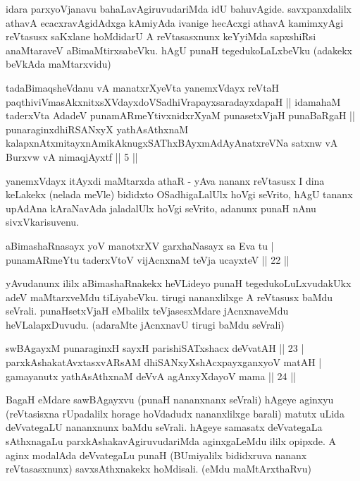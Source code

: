 \begin{artha}
idara parxyoVjanavu bahaLavAgiruvudariMda idU bahuvAgide. 
savxpanxdalilx athavA ecacxravAgidAdxga kAmiyAda ivanige hecAcxgi 
athavA kamimxyAgi reVtasusx saKxlane hoMdidarU A reVtasasxnunx 
keYyiMda sapxshiRsi anaMtaraveV aBimaMtirxsabeVku. hAgU punaH 
tegedukoLaLxbeVku (adakekx beVkAda maMtarxvidu)
\end{artha}


\begin{shl}
tadaBimaqsheVdanu vA manatxrXyeVta yanemxV\s dayx reVtaH paqthiviVmasAkxnitxsXVdayxdoVSadhiVrapayxsaradayxdapaH || idamahaM taderxVta AdadeV punamARmeYtivxnidxrXyaM punasetxVjaH punaBaRgaH || punaraginxdhiRSANxyX yathAsAthxnaM kalapxnAtxmitayxnAmikAknugxSAThxBAyxmAdAyAnatxreVNa satxnw vA Burxvw vA nimaqjAyxtf || 5 ||
\end{shl}

\begin{artha}
yanemxVdayx itAyxdi maMtarxda athaR - yAva nananx reVtasusx I dina 
keLakekx (nelada meVle) bididxto OSadhigaLalUlx hoVgi seVrito, hAgU 
tananx upAdAna kAraNavAda jaladalUlx hoVgi seVrito, adanunx punaH nAnu 
sivxVkarisuvenu.
\end{artha}

\begin{shl}
aBimashaRnasayx yoV manotxrXV garxhaNasayx sa Eva tu | \\
punamARmeYtu taderxVtoV vijAcnxnaM teVja ucayxteV \hfill|| 22 || 
\end{shl}

\begin{artha}
yAvudanunx ililx aBimashaRnakekx heVLideyo punaH tegedukoLuLxvudakUkx 
adeV maMtarxveMdu tiLiyabeVku. tirugi nananxlilxge A reVtasusx baMdu 
seVrali. punaHsetxVjaH eMbalilx teVjasesxMdare jAcnxnaveMdu 
heVLalapxDuvudu. (adaraMte jAcnxnavU tirugi baMdu seVrali)
\end{artha}


\begin{shl}
swBAgayxM punaraginxH sayxH parishiSATxshacx deVvatAH \hfill|| 23 | \\
parxkAshakatAvxtasxvARsAM dhiSANxyXshAcxpayxganxyoV matAH | \\
gamayanutx yathAsAthxnaM deVvA agAnxyXdayoV mama \hfill|| 24 || 
\end{shl}

\begin{artha}
BagaH eMdare sawBAgayxvu (punaH nananxnanx seVrali) hAgeye aginxyu 
(reVtasisxna rUpadalilx horage hoVdadudx nananxlilxge barali) matutx 
uLida deVvategaLU nananxnunx baMdu seVrali. hAgeye samasatx 
deVvategaLa sAthxnagaLu parxkAshakavAgiruvudariMda aginxgaLeMdu ililx 
opipxde. A aginx modalAda deVvategaLu punaH (BUmiyalilx bididxruva 
nananx reVtasasxnunx) savxsAthxnakekx hoMdisali. (eMdu maMtArxthaRvu)
\end{artha}


